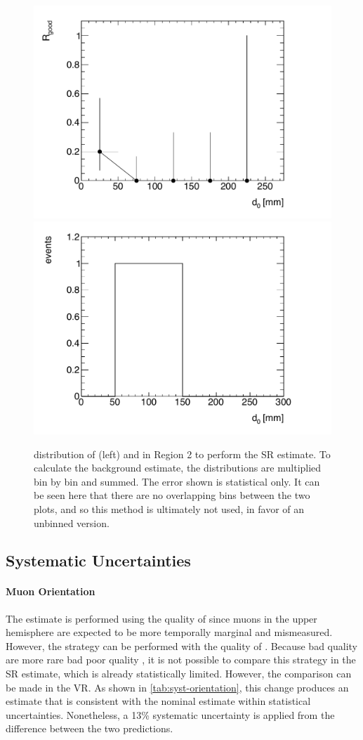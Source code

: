 \begin{figure}[!ht]
\centering
\includegraphics[width=.48\textwidth]{figures/cosmics/d0_SR_v4_rgood.pdf}
\includegraphics[width=.48\textwidth]{figures/cosmics/d0_SR_v4_2mu.pdf}
\caption{\absdz distribution of \rgood (left) and \mt in Region 2 to perform the SR estimate. To calculate the background estimate, the distributions are multiplied bin by bin and summed. The error shown is statistical only. It can be seen here that there are no overlapping bins between the two plots, and so this method is ultimately not used, in favor of an unbinned version.}
\label{fig:SR-rgood}
\end{figure}

\subsection{\label{sec:cos_syst}Systematic Uncertainties}

\paragraph{Muon Orientation}

The estimate is performed using the quality of \mt since muons in the upper hemisphere are expected to be more temporally marginal and mismeasured. However, the strategy can be performed with the quality of \mb. Because bad quality \mb are more rare bad poor quality \mt, it is not possible to compare this strategy in the SR estimate, which is already statistically limited. However, the comparison can be made in the VR. As shown in \autoref{tab:syst-orientation}, this change produces an estimate that is consistent with the nominal estimate within statistical uncertainties. Nonetheless, a 13\% systematic uncertainty is applied from the difference between the two predictions.

